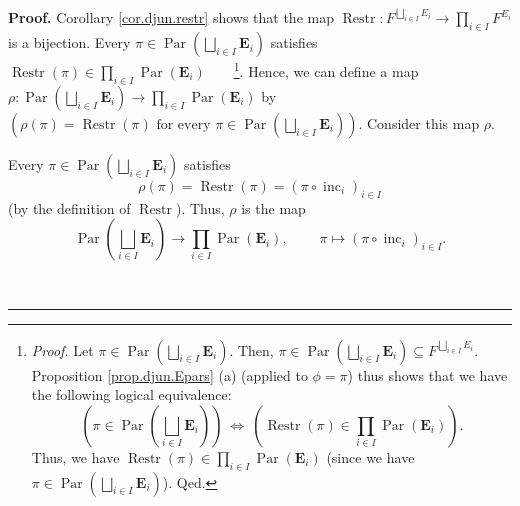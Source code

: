 \documentclass[numbers=enddot,12pt,final,onecolumn,notitlepage,abstracton]{scrartcl}
\theoremstyle{definition}
\newenvironment{proof}[1][Proof]{\noindent\textbf{#1.} }{\ \rule{0.5em}{0.5em}}
\let\prodnonlimits\prod
\renewcommand{\prod}{\prodnonlimits\limits}
\newenvironment{verlong}{}{}
\begin{document}
\begin{verlong}
\begin{footnotesize}
\begin{proof}
Corollary \ref{cor.djun.restr} shows that the map $\operatorname*{Restr}%
:F^{\bigsqcup_{i\in I}E_{i}}\rightarrow\prod_{i\in I}F^{E_{i}}$ is a
bijection. Every $\pi\in\operatorname*{Par}\left(  \bigsqcup_{i\in
I}\mathbf{E}_{i}\right)  $ satisfies $\operatorname*{Restr}\left(  \pi\right)
\in\prod_{i\in I}\operatorname*{Par}\left(  \mathbf{E}_{i}\right)
$\ \ \ \ \footnote{\textit{Proof.} Let $\pi\in\operatorname*{Par}\left(
\bigsqcup_{i\in I}\mathbf{E}_{i}\right)  $. Then, $\pi\in\operatorname*{Par}%
\left(  \bigsqcup_{i\in I}\mathbf{E}_{i}\right)  \subseteq F^{\bigsqcup_{i\in
I}E_{i}}$. Proposition \ref{prop.djun.Epars} (a) (applied to $\phi=\pi$) thus
shows that we have the following logical equivalence:%
\[
\left(  \pi\in\operatorname*{Par}\left(  \bigsqcup_{i\in I}\mathbf{E}%
_{i}\right)  \right)  \ \Longleftrightarrow\ \left(  \operatorname*{Restr}%
\left(  \pi\right)  \in\prod_{i\in I}\operatorname*{Par}\left(  \mathbf{E}%
_{i}\right)  \right)  .
\]
Thus, we have $\operatorname*{Restr}\left(  \pi\right)  \in\prod_{i\in
I}\operatorname*{Par}\left(  \mathbf{E}_{i}\right)  $ (since we have $\pi
\in\operatorname*{Par}\left(  \bigsqcup_{i\in I}\mathbf{E}_{i}\right)  $).
Qed.}. Hence, we can define a map $\rho:\operatorname*{Par}\left(
\bigsqcup_{i\in I}\mathbf{E}_{i}\right)  \rightarrow\prod_{i\in I}%
\operatorname*{Par}\left(  \mathbf{E}_{i}\right)  $ by $\left(  \rho\left(
\pi\right)  =\operatorname*{Restr}\left(  \pi\right)  \text{ for every }\pi
\in\operatorname*{Par}\left(  \bigsqcup_{i\in I}\mathbf{E}_{i}\right)
\right)  $. Consider this map $\rho$.

Every $\pi\in\operatorname*{Par}\left(  \bigsqcup_{i\in I}\mathbf{E}%
_{i}\right)  $ satisfies%
\begin{equation}
\rho\left(  \pi\right)  =\operatorname*{Restr}\left(  \pi\right)  =\left(
\pi\circ\operatorname*{inc}\nolimits_{i}\right)  _{i\in I}
\label{pf.prop.djun.Gamma.rho}%
\end{equation}
(by the definition of $\operatorname*{Restr}$). Thus, $\rho$ is the map%
\[
\operatorname*{Par}\left(  \bigsqcup_{i\in I}\mathbf{E}_{i}\right)
\rightarrow\prod_{i\in I}\operatorname*{Par}\left(  \mathbf{E}_{i}\right)
,\ \ \ \ \ \ \ \ \ \ \pi\mapsto\left(  \pi\circ\operatorname*{inc}%
\nolimits_{i}\right)  _{i\in I}.
\]



\end{proof}
\end{footnotesize}
\end{verlong}
\end{document}
